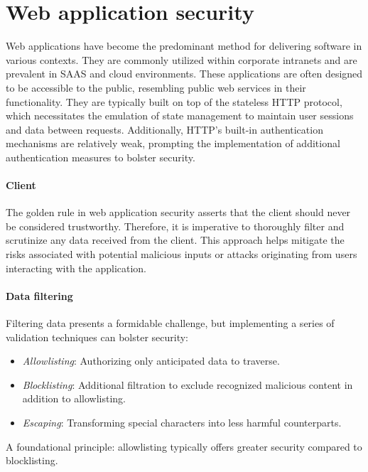 \section{Web application security}

Web applications have become the predominant method for delivering software in various contexts. 
They are commonly utilized within corporate intranets and are prevalent in SAAS and cloud environments. 
These applications are often designed to be accessible to the public, resembling public web services in their functionality.
They are typically built on top of the stateless HTTP protocol, which necessitates the emulation of state management to maintain user sessions and data between requests.
Additionally, HTTP's built-in authentication mechanisms are relatively weak, prompting the implementation of additional authentication measures to bolster security.

\paragraph*{Client}
The golden rule in web application security asserts that the client should never be considered trustworthy. 
Therefore, it is imperative to thoroughly filter and scrutinize any data received from the client. 
This approach helps mitigate the risks associated with potential malicious inputs or attacks originating from users interacting with the application.

\paragraph*{Data filtering}
Filtering data presents a formidable challenge, but implementing a series of validation techniques can bolster security:
\begin{itemize}
    \item \textit{Allowlisting}: Authorizing only anticipated data to traverse.
    \item \textit{Blocklisting}: Additional filtration to exclude recognized malicious content in addition to allowlisting.
    \item \textit{Escaping}: Transforming special characters into less harmful counterparts.
\end{itemize}
A foundational principle: allowlisting typically offers greater security compared to blocklisting.
